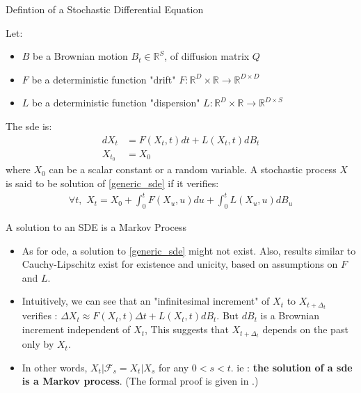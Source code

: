 %
%

\begin{frame}{Defintion of a Stochastic Differential Equation}
    \begin{definition}
            Let:
    \begin{itemize}
        \item $B$ be a Brownian motion $B_t \in \mathbb{R}^S$, of diffusion matrix $Q$
        \item $F$ be a deterministic function "drift" $F : \mathbb{R}^D \times \mathbb{R}\rightarrow \mathbb{R}^{D \times D}$
        \item $L$ be a deterministic function "dispersion" $L : \mathbb{R}^D \times \mathbb{R}\rightarrow \mathbb{R}^{D \times S}$ 
    \end{itemize}

    The \gls{sde} is:
    \begin{align}
        \label{generic_sde}
        dX_t &= F(X_t,t) dt + L(X_t,t) dB_t \\
        X_{t_0} &= X_0
    \end{align}
    where $X_0$ can be a scalar constant or a random variable.
    A stochastic process $X$ is said to be solution of \ref{generic_sde} if it verifies:
    \begin{align*}
        \forall t, \,\, X_t = X_0 + \int_{0}^{t} F(X_u, u)du + \int_{0}^{t} L(X_u,u) dB_u
    \end{align*}
    \end{definition}
\end{frame}

\begin{frame}{A solution to an SDE is a Markov Process}
\begin{itemize}
    \item As for \gls{ode}, a solution to \ref{generic_sde} might not exist. Also, results similar to Cauchy-Lipschitz 
exist for existence and unicity, based on assumptions on $F$ and $L$. 
    \item Intuitively, we can see that an "infinitesimal increment" of $X_t$ to $X_{t+\Delta_t}$ verifies :
$\Delta {X_t} \approx F(X_t, t) \Delta t + L(X_t,t) dB_t$. But $dB_t$ is a Brownian increment independent of $X_t$,
This suggests that $X_{t+ \Delta_t}$ depends on the past only by $X_t$. 
    \item In other words, $X_t \vert \mathcal{F}_s = X_t \vert X_s$ 
for any $0 < s < t$. ie : \textbf{the solution of a \gls{sde} is a Markov process}. (The formal proof is given in \cite{mouvement-brownien-calcul-ito}.)
\end{itemize}
\end{frame}

